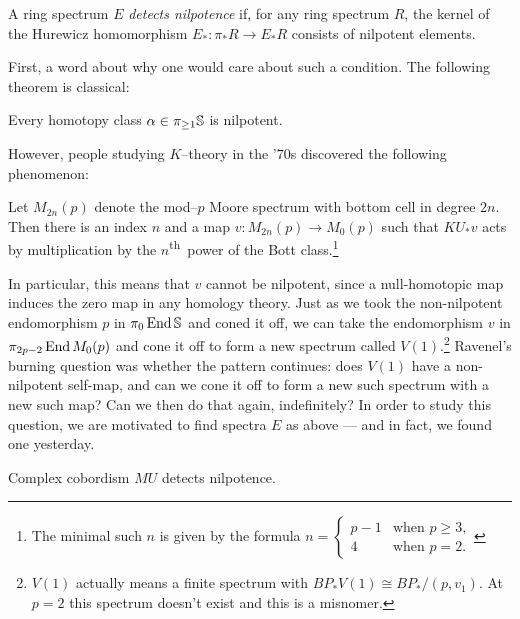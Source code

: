 \begin{definition}
A ring spectrum $E$ \textit{detects nilpotence} if, for any ring spectrum $R$, the kernel of the Hurewicz homomorphism $E_*: \pi_* R \to E_* R$ consists of nilpotent elements.
\end{definition}

First, a word about why one would care about such a condition.  The following theorem is classical:
\begin{theorem}[Nishida]
Every homotopy class $\alpha \in \pi_{\ge 1} \S$ is nilpotent.
\end{theorem}

\noindent However, people studying $K$--theory in the '$70$s discovered the following phenomenon:

\begin{theorem}[Adams]
Let $M_{2n}(p)$ denote the mod--$p$ Moore spectrum with bottom cell in degree $2n$.  Then there is an index $n$ and a map $v: M_{2n}(p) \to M_0(p)$ such that $KU_* v$ acts by multiplication by the $n$\textsuperscript{th}\, power of the Bott class.\footnote{The minimal such $n$ is given by the formula $n = \begin{cases} p-1 & \text{when $p \ge 3$}, \\ 4 & \text{when $p = 2$}. \end{cases}$}
\end{theorem}

\noindent In particular, this means that $v$ cannot be nilpotent, since a null-homotopic map induces the zero map in any homology theory.  Just as we took the non-nilpotent endomorphism $p$ in $\pi_0 \End \S$ and coned it off, we can take the endomorphism $v$ in $\pi_{2p-2} \End M_0(p)$ and cone it off to form a new spectrum called $V(1)$.\footnote{$V(1)$ actually means a finite spectrum with $BP_* V(1) \cong BP_* / (p, v_1)$. At $p = 2$ this spectrum doesn't exist and this is a misnomer.}  Ravenel's burning question was whether the pattern continues: does $V(1)$ have a non-nilpotent self-map, and can we cone it off to form a new such spectrum with a new such map?  Can we then do that again, indefinitely?  In order to study this question, we are motivated to find spectra $E$ as above --- and in fact, we found one yesterday.

\begin{theorem}
Complex cobordism $MU$ detects nilpotence.
\end{theorem}


